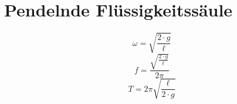 
\begin{comment}
Differentialgleichung: 
\[ \boxed{M = I_s \cdot \ddot{\theta} + \kappa \cdot \theta = 0} \]
\[ \boxed{\theta(t) = \theta_{max} \cdot \cos(\omega \cdot t + \phi)} \]
für kleine Winkel: 
\[ \boxed{\kappa = k_1 \cdot {r_1}^2 + k_2 \cdot {r_2}^2 + \dots } \qquad 
\text{$r$: Abstand Feder zu Drehpunkt} \]
\[ \boxed{\kappa = \sum_{1}^{n} \left(k_n \cdot {r_n}^2\right)} \]
\[ \boxed{\omega = \sqrt{\frac{\kappa}{I}}} \]
\[ \boxed{f = \frac{\sqrt{\dfrac{\kappa}{I}}}{2 \pi}} \]
\[ \boxed{T = 2 \cdot \pi \cdot \sqrt{\frac{I}{\kappa}}} \]
\end{comment}


\begin{comment}
Differentialgleichung: 
\[ \boxed{M = I_z \cdot \ddot{\theta} + d \cdot m \cdot g \cdot \sin(\theta) = 0} \]
für kleine Winkel $\theta$ gilt $\sin(\theta) \approx \theta$: 
\[ \boxed{M = I_z \cdot \ddot{\theta} + d \cdot m \cdot g \cdot \theta = 0} \]
\[ \boxed{\kappa = d \cdot m \cdot g} \qquad 
\text{Ist der Schwerpunkt über dem Drehpunkt, ist $\kappa$ negativ} \]
\[ \boxed{\kappa_{tot} = \kappa_1 + \kappa_2 \dots} \]
\[ \boxed{\kappa_{tot} = \sum_{1}^{n} \left(d_n \cdot m_n \cdot g\right) } \]
\[ \boxed{\omega = \sqrt{\frac{\kappa}{I_z}} 
= \sqrt{\frac{m \cdot g \cdot d}{I_z}}} \]
\[ \boxed{f = \frac{\sqrt{\frac{\kappa}{I_z}}}{2 \pi}
= \frac{\sqrt{\frac{m \cdot g \cdot d}{I_z}}}{2 \pi}} \]
\[ \boxed{T = 2 \cdot \pi \cdot \sqrt{\frac{I_z}{m \cdot g \cdot d}}} \]
speziell: Fadenpendel
\[ \boxed{I = m \cdot L^2} \]
\[ \boxed{\kappa = m \cdot g \cdot L} \]
\[ \boxed{\omega = \sqrt{\frac{g}{L}}} \]
\[ \boxed{f = \frac{\sqrt{\frac{g}{L}}}{2 \cdot \pi}} \]
\[ \boxed{T = 2 \cdot \pi \cdot \sqrt{\frac{L}{g}}} \]
Fadenkraft: 
\[ \boxed{F_s = m \cdot g \cdot \cos(\theta) + m \cdot \frac{v^2}{L} 
= m \cdot g \cdot \cos(\theta) + m \cdot \omega^2 \cdot L} \]
\end{comment}

\section{Pendelnde Flüssigkeitssäule}
\[ \boxed{\omega = \sqrt{\frac{2 \cdot g}{\ell}}} \]
\[ \boxed{f = \frac{\sqrt{\frac{2 \cdot g}{\ell}}}{2 \pi}} \]
\[ \boxed{T = 2 \pi \sqrt{\frac{\ell}{2 \cdot g}}} \]

